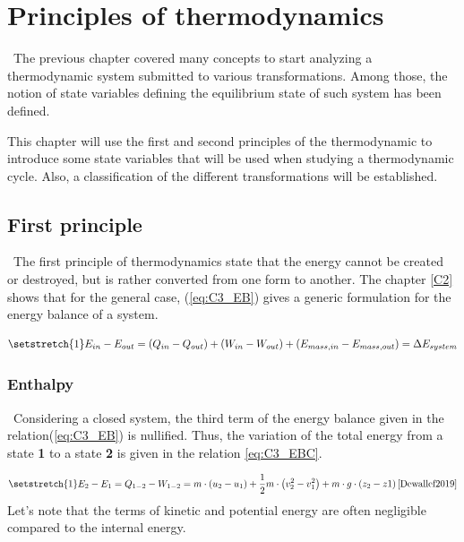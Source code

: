 ﻿\graphicspath{{Chapitre_3/Images/}}
\chapter{Principles of thermodynamics}\label{C3}
\quad\ The previous chapter covered many concepts to start analyzing a thermodynamic system submitted to various transformations. Among those, the notion of state variables defining the equilibrium state of such system has been defined. 

This chapter will use the first and second principles of the thermodynamic to introduce some state variables that will be used when studying a thermodynamic cycle. Also, a classification of the different transformations will be established.
\section{First principle}
\quad\ The first principle of thermodynamics state that the energy cannot be created or destroyed, but is rather converted from one form to another.
The chapter \ref{C2} shows that for the general case, (\ref{eq:C3_EB}) gives a generic formulation for the energy balance of a system. 

\begin{equation}
  \setstretch{1}
  E_{in} - E_{out} = (Q_{in} - Q_{out}) + (W_{in} - W_{out}) + (E_{mass,in} - E_{mass,out}) = \Delta E_{system} \label{eq:C3_EB}
\end{equation}
\subsection{Enthalpy}
\quad\ Considering a closed system, the third term of the energy balance given in the relation(\ref{eq:C3_EB}) is nullified. Thus, the variation of the total energy from a state \textbf{1} to a state \textbf{2} is given in the relation \ref{eq:C3_EBC}.

\begin{equation}
\setstretch{1}
E_{2} - E_{1} = Q_{1-2} - W_{1-2} = m\cdot\left(u_2 - u_1\right) + \frac{1}{2}m\cdot\left(v^2_2 - v^2_1\right) + m\cdot g\cdot\left(z_2 - z1\right)\citep{Dewallef2019} \label{eq:C3_EBC}
\end{equation}
Let’s note that the terms of kinetic and potential energy are often negligible compared to the internal energy.  

